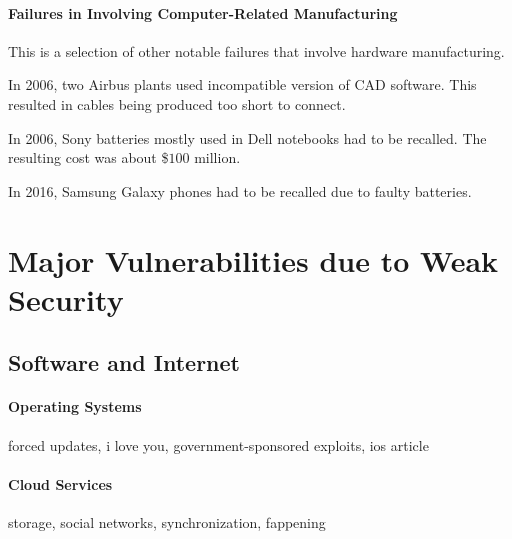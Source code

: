 \paragraph{Failures in Involving Computer-Related Manufacturing}
This is a selection of other notable failures that involve hardware manufacturing.

In 2006, two Airbus plants used incompatible version of CAD software.
This resulted in cables being produced too short to connect.

In 2006, Sony batteries mostly used in Dell notebooks had to be recalled.
The resulting cost was about \$$100$ million.

In 2016, Samsung Galaxy phones had to be recalled due to faulty batteries.

\section{Major Vulnerabilities due to Weak Security}

\subsection{Software and Internet}


\paragraph{Operating Systems}
forced updates, i love you, government-sponsored exploits, ios article

\paragraph{Cloud Services}
storage, social networks, synchronization, fappening

